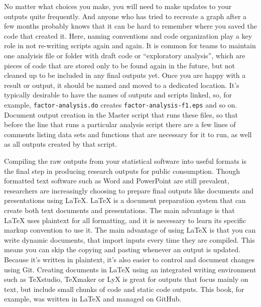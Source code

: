 No matter what choices you make,
you will need to make updates to your outputs quite frequently.
And anyone who has tried to recreate a graph after a few months probably knows
that it can be hard to remember where you saved the code that created it.
Here, naming conventions and code organization play a key role
in not re-writing scripts again and again.
It is common for teams to maintain one analyisis file or folder with draft code or ``exploratory analysis'',
which are pieces of code that are stored only to be found again in the future,
but not cleaned up to be included in any final outputs yet.
Once you are happy with a result or output,
it should be named and moved to a dedicated location.
It's typically desirable to have the names of outputs and scripts linked,
so, for example, \texttt{factor-analysis.do} creates \texttt{factor-analysis-f1.eps} and so on.
Document output creation in the Master script that runs these files,
so that before the line that runs a particular analysis script
there are a few lines of comments listing
data sets and functions that are necessary for it to run,
as well as all outputs created by that script.

Compiling the raw outputs from your statistical software into useful formats
is the final step in producing research outputs for public consumption.
Though formatted text software such as Word and PowerPoint are still prevalent,
researchers are increasingly choosing to prepare final outputs
like documents and presentations using {\LaTeX}\index{{\LaTeX}}.
{\LaTeX} is a document preparation system that can create both text documents and presentations.
The main advantage is that {\LaTeX} uses plaintext for all formatting,
and it is necessary to learn its specific markup convention to use it.
The main advantage of using {\LaTeX} is that you can write dynamic documents,
that import inputs every time they are compiled.
This means you can skip the copying and pasting whenever an output is updated.
Because it's written in plaintext, it's also easier to control and document changes using Git.
Creating documents in {\LaTeX} using an integrated writing environment such as TeXstudio, TeXmaker or LyX
is great for outputs that focus mainly on text,
but include small chunks of code and static code outputs.
This book, for example, was written in {\LaTeX} and managed on GitHub.

